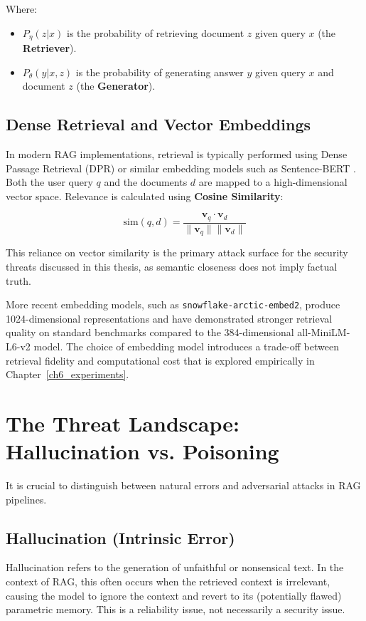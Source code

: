 Where:
\begin{itemize}
    \item $P_{\eta}(z|x)$ is the probability of retrieving document $z$ given query $x$ (the \textbf{Retriever}).
    \item $P_{\theta}(y|x, z)$ is the probability of generating answer $y$ given query $x$ and document $z$ (the \textbf{Generator}).
\end{itemize}

\subsection{Dense Retrieval and Vector Embeddings}
In modern RAG implementations, retrieval is typically performed using Dense Passage Retrieval (DPR) or similar embedding models such as Sentence-BERT \parencite{reimers2019sentence}. Both the user query $q$ and the documents $d$ are mapped to a high-dimensional vector space. Relevance is calculated using \textbf{Cosine Similarity}:

\begin{equation}
    \text{sim}(q, d) = \frac{\mathbf{v}_q \cdot \mathbf{v}_d}{\|\mathbf{v}_q\| \|\mathbf{v}_d\|}
\end{equation}

This reliance on vector similarity is the primary attack surface for the security threats discussed in this thesis, as semantic closeness does not imply factual truth.

More recent embedding models, such as \texttt{snowflake-arctic-embed2}, produce 1024-dimensional representations and have demonstrated stronger retrieval quality on standard benchmarks compared to the 384-dimensional all-MiniLM-L6-v2 model. The choice of embedding model introduces a trade-off between retrieval fidelity and computational cost that is explored empirically in Chapter~\ref{ch6_experiments}.

\section{The Threat Landscape: Hallucination vs. Poisoning}
\label{sec:threat_landscape}

It is crucial to distinguish between natural errors and adversarial attacks in RAG pipelines.

\subsection{Hallucination (Intrinsic Error)}
Hallucination refers to the generation of unfaithful or nonsensical text. In the context of RAG, this often occurs when the retrieved context is irrelevant, causing the model to ignore the context and revert to its (potentially flawed) parametric memory. This is a reliability issue, not necessarily a security issue.

